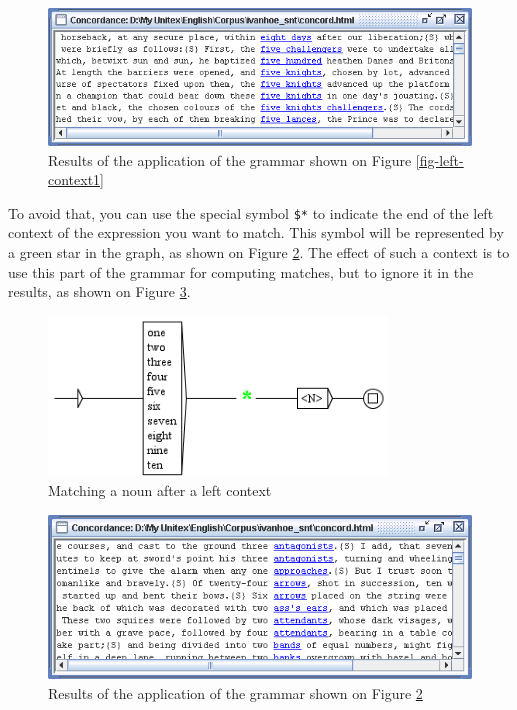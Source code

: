 \begin{figure}[!ht]
\begin{center}
\includegraphics[width=14cm]{resources/img/fig6-17b.png}
\caption{Results of the application of the grammar shown on Figure
\ref{fig-left-context1}\label{fig-left-context2}}
\end{center}
\end{figure}

\bigskip
\noindent To avoid that, you can use the special symbol \verb+$*+ to indicate
the end of the left context of the expression you want to match. This symbol
will be represented by a green star in the graph, as shown on Figure
\ref{fig-left-context3}. The effect of such a context is to use this part of the
grammar for computing matches, but to ignore it in the results, as shown on
Figure \ref{fig-left-context4}.

\begin{figure}[!ht]
\begin{center}
\includegraphics[width=9cm]{resources/img/fig6-17c.png}
\caption{Matching a noun after a left context\label{fig-left-context3}}
\end{center}
\end{figure}

\begin{figure}[!ht]
\begin{center}
\includegraphics[width=14cm]{resources/img/fig6-17d.png}
\caption{Results of the application of the grammar shown on Figure
\ref{fig-left-context3}\label{fig-left-context4}}
\end{center}
\end{figure}

